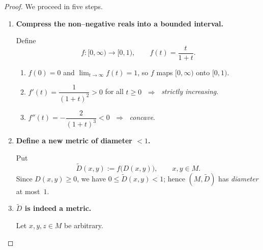 \documentclass[12pt]{article}
\theoremstyle{definition} %
\theoremstyle{plain} %
\begin{document}
\begin{proof}
  We proceed in five steps.

  \begin{enumerate}
      \item \textbf{Compress the non–negative reals into a bounded
            interval.}

            Define 
            \[
                f:[0,\infty)\longrightarrow[0,1), 
                \qquad 
                f(t)=\frac{t}{1+t}.
            \]

            \begin{enumerate}
                \item $f(0)=0$ and $\displaystyle\lim_{t\to\infty}f(t)=1$, so
                      $f$ maps \([0,\infty)\) onto \([0,1)\).
                \item $f'(t)=\dfrac{1}{(1+t)^2}>0$ for all $t\ge0$
                      $\;\Rightarrow\;$ \emph{strictly increasing}.
                \item $f''(t)=-\dfrac{2}{(1+t)^3}<0$
                      $\;\Rightarrow\;$ \emph{concave}.
            \end{enumerate}

      \item \textbf{Define a new metric of diameter $<1$.}

            Put
            \[
                \widetilde D(x,y):=f\!\bigl(D(x,y)\bigr),
                \qquad
                x,y\in M.
            \]
            Since $D(x,y)\ge0$, we have $0\le\widetilde D(x,y)<1$; hence
            $(M,\widetilde D)$ has \emph{diameter} at most~$1$.

      \item \textbf{$\widetilde D$ is indeed a metric.}

            Let $x,y,z\in M$ be arbitrary.


\end{enumerate}
\end{proof}
\end{document}
